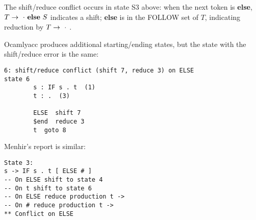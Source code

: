 \documentclass[twocolumn]{article}
\begin{document}
\begin{enumerate}

The shift/reduce conflict occurs in state S3 above: when the next
token is \textbf{else}, $T \rightarrow \ \cdot\  \textbf{else}\ S$ 
indicates a shift; \textbf{else} is in the FOLLOW set of
$T$, indicating reduction by $T \rightarrow \ \cdot\ $.

Ocamlyacc produces additional starting/ending states, but the state with the shift/reduce error is the same:

\begin{verbatim}
6: shift/reduce conflict (shift 7, reduce 3) on ELSE
state 6
        s : IF s . t  (1)
        t : .  (3)

        ELSE  shift 7
        $end  reduce 3
        t  goto 8
\end{verbatim}

Menhir's report is similar:

\begin{verbatim}
State 3:
s -> IF s . t [ ELSE # ]
-- On ELSE shift to state 4
-- On t shift to state 6
-- On ELSE reduce production t -> 
-- On # reduce production t -> 
** Conflict on ELSE
\end{verbatim}

\end{enumerate}
\end{document}
